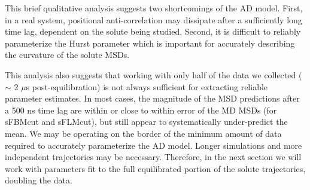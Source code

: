 \documentclass{article}
\begin{document}
  This brief qualitative analysis suggests two shortcomings of the AD model. First, in
  a real system, positional anti-correlation may dissipate after a sufficiently long 
  time lag, dependent on the solute being studied. Second, it is difficult to reliably
  parameterize the Hurst parameter which is important for accurately describing the 
  curvature of the solute MSDs.
  
  This analysis also suggests that working with only half of the data we collected
  ($\sim$ 2 $\mu$s post-equilibration) is not always sufficient for extracting reliable
  parameter estimates. In most cases, the magnitude of the MSD predictions after a 
  500 ns time lag are within or close to within error of the MD MSDs (for sFBMcut and
  sFLMcut), but still appear to systematically under-predict the mean. We may be
  operating on the border of the minimum amount of data required to accurately 
  parameterize the AD model. Longer simulations and more independent trajectories may
  be necessary. Therefore, in the next section we will work with parameters fit to the
  full equilibrated portion of the solute trajectories, doubling the data.
  
  


 
\end{document}
